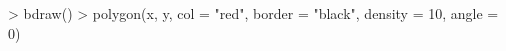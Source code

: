 \begin{Schunk}
\begin{Sinput}
> bdraw()
> polygon(x, y, col = "red", border = "black", density = 10, angle = 0)
\end{Sinput}
\end{Schunk}
